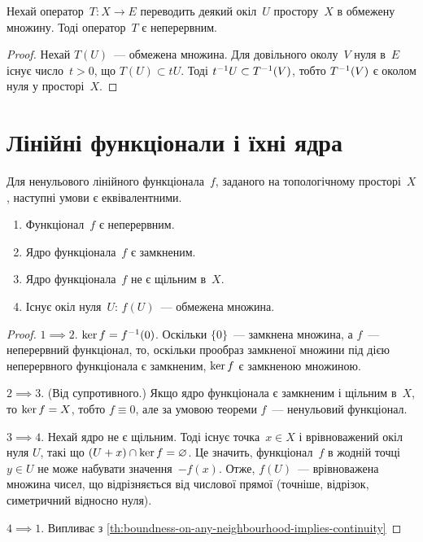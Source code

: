 \begin{theorem}
    \label{th:boundness-on-any-neighbourhood-implies-continuity}
    Нехай оператор~$T: X \to E$ переводить деякий окіл~$U$ простору~$X$ в обмежену множину. Тоді оператор~$T$ є неперервним.
\end{theorem}

\begin{proof}
    Нехай $T(U)$~--- обмежена множина. Для довільного околу~$V$ нуля в~$E$ існує число~$t > 0$, що $T(U) \subset t U$. Тоді $t^{-1} U \subset T^{-1}(V)$, тобто $T^{-1}(V)$ є околом нуля у просторі~$X$.
\end{proof}

\section{Лінійні функціонали і їхні ядра}

\begin{theorem}
    \label{th:linear-functional-continuity-equivalent-conditions}
    Для ненульового лінійного функціонала~$f$, заданого на топологічному просторі~$X$, наступні умови є еквівалентними.
    \begin{enumerate}
        \item Функціонал~$f$ є неперервним.
        \item Ядро функціонала~$f$ є замкненим.
        \item Ядро функціонала~$f$ не є щільним в~$X$.
        \item Існує окіл нуля~$U$: $f(U)$~--- обмежена множина.
    \end{enumerate}
\end{theorem}

\begin{proof}
    $1 \implies 2$. $\operatorname{ker} f = f^{-1}(0)$. Оскільки $\{0\}$~--- замкнена множина, а $f$~--- неперервний функціонал, то, оскільки прообраз замкненої множини під дією неперервного функціонала є замкненим, $\operatorname{ker} f$ є замкненою множиною.

    $2 \implies 3$. (Від супротивного.) Якщо ядро функціонала є замкненим і щільним в~$X$, то $\operatorname{ker} f = X$, тобто $f \equiv 0$, але за умовою теореми $f$~--- ненульовий функціонал.

    $3 \implies 4$. Нехай ядро не є щільним. Тоді існує точка~$x \in X$ і врівноважений окіл нуля $U$, такі що $(U + x) \cap \operatorname{ker} f = \varnothing$. Це значить, функціонал~$f$ в жодній точці~$y \in U$ не може набувати значення~$-f(x)$. Отже, $f(U)$~--- врівноважена множина чисел, що відрізняється від числової прямої (точніше, відрізок, симетричний відносно нуля).

    $4 \implies 1$. Випливає з \cref{th:boundness-on-any-neighbourhood-implies-continuity}
\end{proof}


